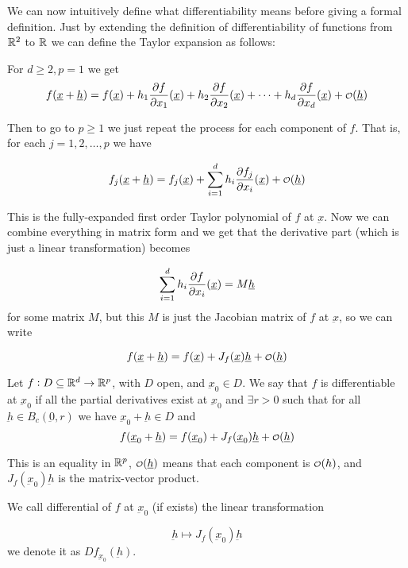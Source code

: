 \documentclass[12pt]{report}
\renewcommand{\vec}[1]{\underbar{\ensuremath{#1}}}
\begin{document}
We can now intuitively define what differentiability means before giving a formal definition.
Just by extending the definition of differentiability of functions from $\mathbb{R}^2$ to $\mathbb{R}$ we can define the Taylor expansion as follows:

For $d \geq 2, p = 1$ we get
$$
    f(\vec{x} + \vec{h}) = f(\vec{x}) + h_1 \pdv{f}{x_1}()(\vec{x}) + h_2 \pdv{f}{x_2}()(\vec{x}) + \cdots + h_d \pdv{f}{x_d}()(\vec{x}) + \o(\vec{h})
$$

Then to go to $p \geq 1$ we just repeat the process for each component of $f$.
That is, for each $j = 1, 2, \ldots, p$ we have

$$
    f_j(\vec{x} + \vec{h}) = f_j(\vec{x}) + \sum_{i=1}^d h_i \pdv{f_j}{x_i}()(\vec{x}) + \o(\vec{h})
$$

This is the fully-expanded first order Taylor polynomial of $f$ at $\vec{x}$.
Now we can combine everything in matrix form and we get that the derivative part (which is just a linear transformation) becomes

$$
    \sum_{i = 1}^d h_i \pdv{f}{x_i}()(\vec{x}) = M \vec{h}
$$
for some matrix $M$, but this $M$ is just the Jacobian matrix of $f$ at $\vec{x}$, so we can write

$$
    f(\vec{x} + \vec{h}) = f(\vec{x}) + J_f(\vec{x}) \vec{h} + \o(\vec{h})
$$

\begin{definition}[differentiability]
    Let $f: D \subseteq \mathbb{R}^d \to \mathbb{R}^p$, with $D$ open, and $\vec{x}_0 \in D$.
    We say that $f$ is differentiable at $\vec{x}_0$ if all the partial derivatives exist at $\vec{x}_0$
    and $\exists r > 0$ such that for all $\vec{h} \in B_c(\vec{0}, r)$ we have $\vec{x}_0 + \vec{h} \in D$ and
    $$
        f(\vec{x}_0 + \vec{h}) = f(\vec{x}_0) + J_f(\vec{x}_0) \vec{h} + \o(\vec{h})
    $$
\end{definition}

\begin{remark}
    This is an equality in $\mathbb{R}^p$, $\o(\vec{h})$ means that each component is $\o(h)$, and $J_f(\vec{x}_0) \vec{h}$ is the matrix-vector product.
\end{remark}

\begin{definition}[differential]
    We call differential of $f$ at $\vec{x}_0$ (if exists) the linear transformation

    $$
        \vec{h} \mapsto J_f(\vec{x}_0) \vec{h}
    $$
    we denote it as $Df_{\vec{x}_0}(\vec{h})$.
\end{definition}
\end{document}
